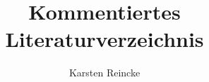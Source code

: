 \documentclass[
  DIV=calc,
  BCOR=5mm,
  11pt,
  headings=small,
  oneside,
  abstract=true,
  toc=bib,
  english,ngerman]{scrartcl}
\begin{document}
\nocite{*}

\subject{Zen Literatur}
\title{Kommentiertes Literaturverzeichnis}
\author{Karsten Reincke}

\maketitle

\small
%

\end{document}
